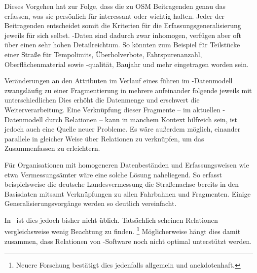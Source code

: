 \documentclass[../main/thesis.tex]{subfiles}
\begin{document}
Dieses Vorgehen hat
zur Folge, dass die zu OSM Beitragenden genau das erfassen, was sie persönlich für interessant oder wichtig halten. 
Jeder der Beitragenden entscheidet somit die Kriterien für die Erfassungsgeneralisierung jeweils für sich selbst.
\osm-Daten sind dadurch zwar inhomogen, verfügen aber oft über einen sehr hohen Detailreichtum. 
So könnten zum Beispiel für Teilstücke einer Straße  für Tempolimits, Überholverbote, Fahrspurenanzahl, Oberflächenmaterial sowie -qualität, Baujahr und mehr eingetragen worden sein. 



Veränderungen an den Attributen im Verlauf eines  führen im \osm-Datenmodell zwangsläufig zu einer Fragmentierung in mehrere aufeinander folgende  jeweils mit unterschiedlichen 
Dies erhöht die Datenmenge und erschwert die Weiterverarbeitung.
Eine Verknüpfung dieser Fragmente -- im aktuellen \osm-Datenmodell durch Relationen -- kann in manchem Kontext hilfreich sein, ist jedoch auch eine Quelle neuer Probleme. 
Es wäre außerdem möglich, einander parallele  in gleicher Weise über Relationen zu verknüpfen, um das Zusammenfassen zu erleichtern.

Für Organisationen mit homogeneren Datenbeständen und Erfassungsweisen wie etwa Vermessungsämter wäre eine solche Lösung naheliegend.
So erfasst beispielsweise die deutsche Landesvermessung die Straßenachse bereits in den Basisdaten mitsamt Verknüpfungen zu allen Fahrbahnen und Fragmenten. 
Einige Generalisierungsvorgänge werden so deutlich vereinfacht. 

In \osm\ ist dies jedoch bisher nicht üblich.
Tatsächlich scheinen Relationen vergleichsweise wenig Beachtung zu finden.%
\footnote{Neuere Forschung bestätigt dies jedenfalls allgemein und anekdotenhaft. }
Möglicherweise hängt dies damit zusammen, dass Relationen von \osm-Software noch nicht optimal unterstützt werden. 
\end{document}
